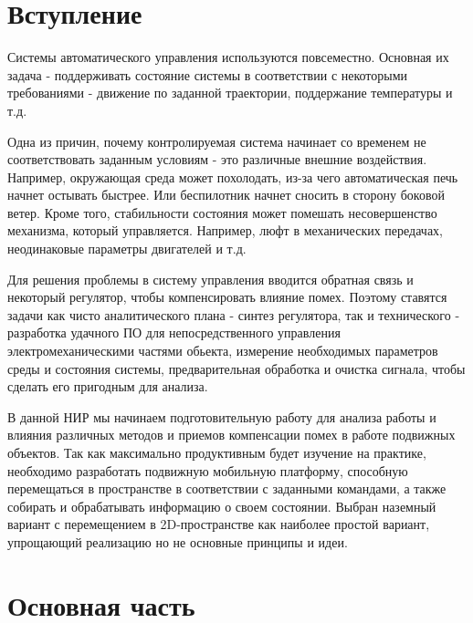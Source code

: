 \documentclass[14pt,a4paper,russian]{scrartcl}
\begin{document}
\renewcommand{\onlyinsubfile}[1]{}
\renewcommand{\notinsubfile}[1]{#1}

% 

\tableofcontents
\newpage

\section*{Вступление}
Системы автоматического управления используются повсеместно. Основная 
их задача - поддерживать состояние системы в соответствии 
с некоторыми требованиями - движение по заданной траектории, поддержание температуры и т.д.

Одна из причин, почему контролируемая система начинает со временем
не соответствовать заданным условиям - это различные внешние воздействия. Например,
окружающая среда может похолодать, из-за чего автоматическая печь начнет остывать
быстрее. Или беспилотник начнет сносить в сторону боковой ветер. Кроме того, 
стабильности состояния может помешать несовершенство механизма, который управляется.
Например, люфт в механических передачах, неодинаковые параметры двигателей и т.д.

Для решения проблемы в систему управления вводится обратная связь и некоторый 
регулятор, чтобы компенсировать влияние помех. Поэтому ставятся задачи как чисто 
аналитического плана - синтез регулятора, так и технического - разработка
удачного ПО для непосредственного управления электромеханическими частями обьекта,
измерение необходимых параметров среды и состояния системы, предварительная обработка
и очистка сигнала, чтобы сделать его пригодным для анализа.

В данной НИР мы начинаем подготовительную работу для анализа работы и влияния
различных методов и приемов компенсации помех в работе подвижных объектов. 
Так как максимально продуктивным будет изучение на практике, необходимо разработать
подвижную мобильную платформу, способную перемещаться в пространстве в соответствии
с заданными командами, а также собирать и обрабатывать информацию о своем состоянии.
Выбран наземный вариант с перемещением в 2D-пространстве как наиболее простой вариант,
упрощающий реализацию но не основные принципы и идеи.

\newpage

\section*{Основная часть}
\end{document}
